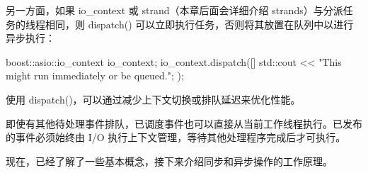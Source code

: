 另一方面，如果 io\_context 或 strand（本章后面会详细介绍 strands）与分派任务的线程相同，则 dispatch() 可以立即执行任务，否则将其放置在队列中以进行异步执行：

\begin{cpp}
boost::asio::io_context io_context;
io_context.dispatch([] {
    std::cout << "This might run immediately or be queued.\n";
});
\end{cpp}

使用 dispatch()，可以通过减少上下文切换或排队延迟来优化性能。

即使有其他待处理事件排队，已调度事件也可以直接从当前工作线程执行。已发布的事件必须始终由 I/O 执行上下文管理，等待其他处理程序完成后才可执行。

现在，已经了解了一些基本概念，接下来介绍同步和异步操作的工作原理。











